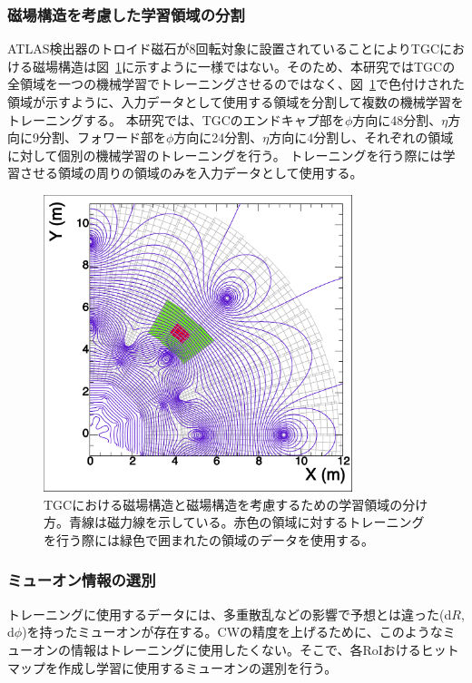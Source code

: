 \subsubsection{磁場構造を考慮した学習領域の分割}
ATLAS検出器のトロイド磁石が8回転対象に設置されていることによりTGCにおける磁場構造は図~\ref{fig:Mag}に示すように一様ではない。そのため、本研究ではTGCの全領域を一つの機械学習でトレーニングさせるのではなく、図~\ref{fig:Mag}で色付けされた領域が示すように、入力データとして使用する領域を分割して複数の機械学習をトレーニングする。
本研究では、TGCのエンドキャプ部を$\phi$方向に48分割、$\eta$方向に9分割、フォワード部を$\phi$方向に24分割、$\eta$方向に4分割し、それぞれの領域に対して個別の機械学習のトレーニングを行う。
トレーニングを行う際には学習させる領域の周りの領域のみを入力データとして使用する。
\begin{figure}[tb]
  \centering
  \includegraphics[bb=2 3 555 540,clip, width=9cm]{fig/4/c1_withMag.pdf}
  \caption{TGCにおける磁場構造と磁場構造を考慮するための学習領域の分け方。青線は磁力線を示している。赤色の領域に対するトレーニングを行う際には緑色で囲まれたの領域のデータを使用する。}
  \label{fig:Mag}
\end{figure}

\subsubsection{ミューオン情報の選別}
トレーニングに使用するデータには、多重散乱などの影響で予想とは違った(d$R$, d$\phi$)を持ったミューオンが存在する。CWの精度を上げるために、このようなミューオンの情報はトレーニングに使用したくない。そこで、各RoIおけるヒットマップを作成し学習に使用するミューオンの選別を行う。

